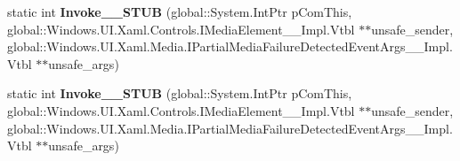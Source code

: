 \begin{DoxyCompactItemize}
\mbox{\label{struct_windows_1_1_foundation_1_1_typed_event_handler___a___windows___u_i___xaml___controls___meab68a8b38914bc3ba3e7f1414dd848fa_a2574928f832dada48d5c4678cc62559c}} 
static int {\bfseries Invoke\+\_\+\+\_\+\+S\+T\+UB} (global\+::\+System.\+Int\+Ptr p\+Com\+This, global\+::\+Windows.\+U\+I.\+Xaml.\+Controls.\+I\+Media\+Element\+\_\+\+\_\+\+Impl.\+Vtbl $\ast$$\ast$unsafe\+\_\+sender, global\+::\+Windows.\+U\+I.\+Xaml.\+Media.\+I\+Partial\+Media\+Failure\+Detected\+Event\+Args\+\_\+\+\_\+\+Impl.\+Vtbl $\ast$$\ast$unsafe\+\_\+args)
\item 
\mbox{\label{struct_windows_1_1_foundation_1_1_typed_event_handler___a___windows___u_i___xaml___controls___meab68a8b38914bc3ba3e7f1414dd848fa_a2574928f832dada48d5c4678cc62559c}} 
static int {\bfseries Invoke\+\_\+\+\_\+\+S\+T\+UB} (global\+::\+System.\+Int\+Ptr p\+Com\+This, global\+::\+Windows.\+U\+I.\+Xaml.\+Controls.\+I\+Media\+Element\+\_\+\+\_\+\+Impl.\+Vtbl $\ast$$\ast$unsafe\+\_\+sender, global\+::\+Windows.\+U\+I.\+Xaml.\+Media.\+I\+Partial\+Media\+Failure\+Detected\+Event\+Args\+\_\+\+\_\+\+Impl.\+Vtbl $\ast$$\ast$unsafe\+\_\+args)
\end{DoxyCompactItemize}
